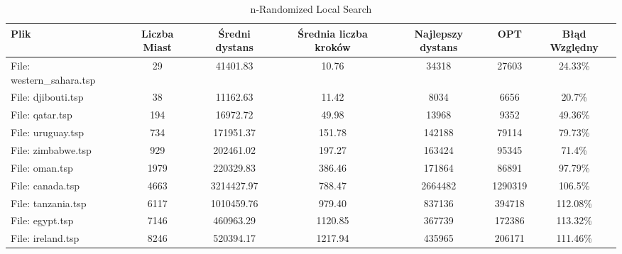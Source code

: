 \begin{table}[H]
    \centering
    \caption{n-Randomized Local Search}
    \begin{tabular}{lcccccc}
        \toprule
        Plik & Liczba Miast & Średni dystans & Średnia liczba kroków & Najlepszy dystans & OPT & Błąd Względny \\
        \midrule
        File: western\_sahara.tsp & 29   & 41401.83  & 10.76    & 34318      & 27603 & 24.33\% \\
        File: djibouti.tsp   & 38   & 11162.63  & 11.42    & 8034       & 6656 & 20.7\% \\
        File: qatar.tsp      & 194  & 16972.72  & 49.98    & 13968      & 9352 & 49.36\% \\
        File: uruguay.tsp    & 734  & 171951.37 & 151.78   & 142188     & 79114 & 79.73\% \\
        File: zimbabwe.tsp   & 929  & 202461.02 & 197.27   & 163424     & 95345 & 71.4\% \\
        File: oman.tsp       & 1979 & 220329.83 & 386.46   & 171864     & 86891 & 97.79\% \\
        File: canada.tsp     & 4663 & 3214427.97 & 788.47   & 2664482    & 1290319 & 106.5\% \\
        File: tanzania.tsp   & 6117 & 1010459.76 & 979.40   & 837136     & 394718 & 112.08\% \\
        File: egypt.tsp      & 7146 & 460963.29 & 1120.85  & 367739     & 172386 & 113.32\% \\
        File: ireland.tsp    & 8246 & 520394.17 & 1217.94  & 435965     & 206171 & 111.46\% \\
        \bottomrule
    \end{tabular}
\end{table}
